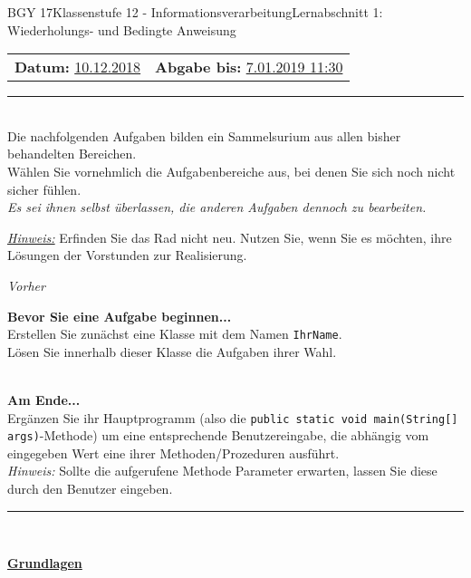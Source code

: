 \documentclass[oneside,openany,headings=optiontotoc,11pt,numbers=noenddot]{scrreprt}
\begin{document}
	\begin{worksheet}{BGY 17}{Klassenstufe 12 - Informationsverarbeitung}{Lernabschnitt 1: Wiederholungs- und Bedingte Anweisung}
				
		\noindent
		\sffamily
		\begin{tabularx}{\textwidth}{Xr}
			\textbf{Datum:} \underline{10.12.2018} & \textbf{Abgabe bis:} \underline{7.01.2019 11:30}
		\end{tabularx}
		\par\noindent
		\rule{\textwidth}{0.1pt}\\
		Die nachfolgenden Aufgaben bilden ein Sammelsurium aus allen bisher behandelten Bereichen.\\
		Wählen Sie vornehmlich die Aufgabenbereiche aus, bei denen Sie sich noch nicht sicher fühlen.\\
		\textit{Es sei ihnen selbst überlassen, die anderen Aufgaben dennoch zu bearbeiten.}\\
		\par\noindent
		\underline{\textit{Hinweis:}} Erfinden Sie das Rad nicht neu. Nutzen Sie, wenn Sie es möchten, ihre Lösungen der Vorstunden zur Realisierung.
		\begin{framed}
			\noindent
			\large{\textit{Vorher}}\\
			\normalsize
			\par\noindent
			\textbf{Bevor Sie eine Aufgabe beginnen...}\\
			Erstellen Sie zunächst eine Klasse mit dem Namen \lstinline[style=JavaInputStyle]|IhrName|.\\
			Lösen Sie innerhalb dieser Klasse die Aufgaben ihrer Wahl.\\
			\hdashrule{\textwidth}{0.1pt}{4pt}\\
			\par\noindent
			\textbf{Am Ende...}\\
			Ergänzen Sie ihr Hauptprogramm (also die \lstinline[style=JavaInputStyle]|public static void main(String[] args)|-Methode) um eine entsprechende Benutzereingabe, die abhängig vom eingegeben Wert eine ihrer Methoden/Prozeduren ausführt.\\
			\textit{Hinweis:} Sollte die aufgerufene Methode Parameter erwarten, lassen Sie diese durch den Benutzer eingeben.\\
			\rule{\textwidth}{1mm}\\
			\par\noindent
			\large{\textbf{\underline{Grundlagen}}}\\
			\normalsize
			\par\noindent

\end{framed}
\end{worksheet}
\end{document}
